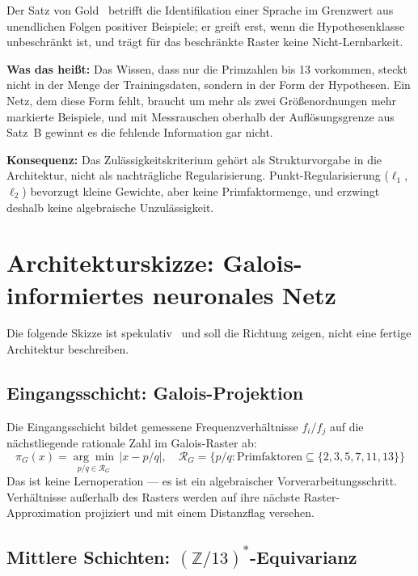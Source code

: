Der Satz von Gold \LM\,\cite{Gold1967} betrifft die Identifikation einer
Sprache im Grenzwert aus unendlichen Folgen positiver Beispiele; er
greift erst, wenn die Hypothesenklasse unbeschränkt ist, und trägt für
das beschränkte Raster keine Nicht-Lernbarkeit.

\textbf{Was das heißt:} Das Wissen, dass nur die Primzahlen bis 13
vorkommen, steckt nicht in der Menge der Trainingsdaten, sondern in der
Form der Hypothesen. Ein Netz, dem diese Form fehlt, braucht um mehr als
zwei Größenordnungen mehr markierte Beispiele, und mit Messrauschen
oberhalb der Auflösungsgrenze aus Satz~B gewinnt es die fehlende
Information gar nicht.

\textbf{Konsequenz:} Das Zulässigkeitskriterium gehört als Strukturvorgabe
in die Architektur, nicht als nachträgliche Regularisierung.
Punkt-Regularisierung ($\ell_1$, $\ell_2$) bevorzugt kleine Gewichte,
aber keine Primfaktormenge, und erzwingt deshalb keine algebraische
Unzulässigkeit.

\section{Architekturskizze: Galois-informiertes neuronales Netz}
\label{sec:arch}

Die folgende Skizze ist spekulativ \SM\ und soll die Richtung zeigen,
nicht eine fertige Architektur beschreiben.

\subsection*{Eingangsschicht: Galois-Projektion}

Die Eingangsschicht bildet gemessene Frequenzverhältnisse $f_i/f_j$
auf die nächstliegende rationale Zahl im Galois-Raster ab:
\[
  \pi_G(x) = \underset{p/q \in \mathcal{R}_G}{\arg\min}\,|x - p/q|,
  \quad \mathcal{R}_G = \{p/q : \text{Primfaktoren} \subseteq \{2,3,5,7,11,13\}\}
\]
Das ist keine Lernoperation --- es ist ein algebraischer Vorverarbeitungsschritt.
Verhältnisse außerhalb des Rasters werden auf ihre nächste Raster-Approximation
projiziert und mit einem Distanzflag versehen.

\subsection*{Mittlere Schichten: $(\mathbb{Z}/13)^*$-Equivarianz}

